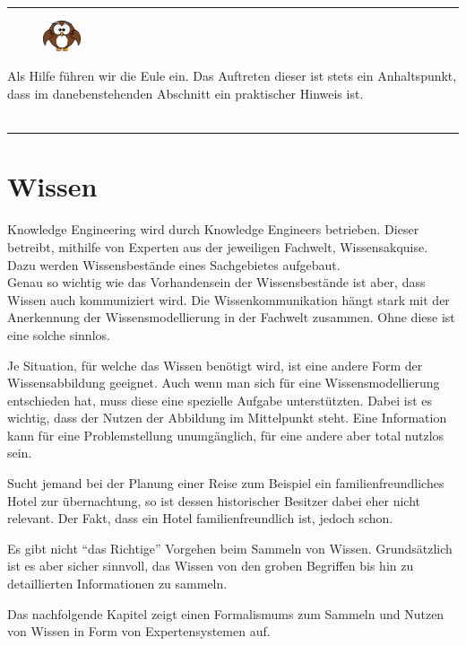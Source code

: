 \noindent\rule[1ex]{\textwidth}{1pt}
\vspace{0.1pt}
\begin{figure}
    \vspace{-19pt}
    \includegraphics[width=0.1\textwidth]{bilder/owl.png}
\end{figure}
Als Hilfe führen wir die Eule ein. Das Auftreten dieser ist stets ein Anhaltspunkt, dass im danebenstehenden Abschnitt ein praktischer Hinweis ist.\\
\\

\noindent\rule[1ex]{\textwidth}{1pt}

\newpage

\section{Wissen}
\label{chap:einleitung_wissen}


Knowledge Engineering wird durch Knowledge Engineers betrieben. Dieser betreibt, mithilfe von Experten aus der jeweiligen Fachwelt, Wissensakquise. Dazu werden Wissensbestände eines Sachgebietes aufgebaut. \\
Genau so wichtig wie das Vorhandensein der Wissensbestände ist aber, dass Wissen auch kommuniziert wird. Die Wissenkommunikation hängt stark mit der Anerkennung der Wissensmodellierung in der Fachwelt zusammen. Ohne diese ist eine solche sinnlos.

Je Situation, für welche das Wissen benötigt wird, ist eine andere Form der Wissensabbildung geeignet. Auch wenn man sich für eine Wissensmodellierung entschieden hat, muss diese eine spezielle Aufgabe unterstützten. Dabei ist es wichtig, dass der Nutzen der Abbildung im Mittelpunkt steht. Eine Information kann für eine Problemstellung unumgänglich, für eine andere aber total nutzlos sein.

Sucht jemand bei der Planung einer Reise zum Beispiel ein familienfreundliches Hotel zur übernachtung, so ist dessen historischer Besitzer dabei eher nicht relevant. Der Fakt, dass ein Hotel familienfreundlich ist, jedoch schon.

Es gibt nicht ``das Richtige'' Vorgehen beim Sammeln von Wissen. Grundsätzlich ist es aber sicher sinnvoll, das Wissen von den groben Begriffen bis hin zu detaillierten Informationen zu sammeln.

Das nachfolgende Kapitel zeigt einen Formalismums zum Sammeln und Nutzen von Wissen in Form von Expertensystemen auf.
